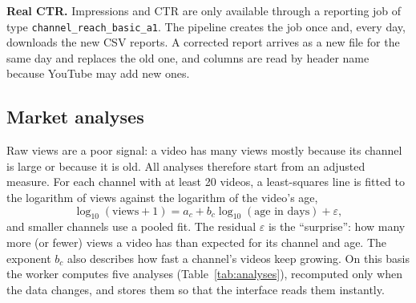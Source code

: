 \textbf{Real CTR.} Impressions and CTR are only available through a reporting job of type \texttt{channel\_reach\_basic\_a1}. The pipeline creates the job once and, every day, downloads the new CSV reports. A corrected report arrives as a new file for the same day and replaces the old one, and columns are read by header name because YouTube may add new ones.

\subsection*{Market analyses}

Raw views are a poor signal: a video has many views mostly because its channel is large or because it is old. All analyses therefore start from an adjusted measure. For each channel with at least 20 videos, a least-squares line is fitted to the logarithm of views against the logarithm of the video's age,
\begin{equation}
\log_{10}(\text{views}+1) = a_c + b_c \log_{10}(\text{age in days}) + \varepsilon ,
\label{eq:residual}
\end{equation}
and smaller channels use a pooled fit. The residual $\varepsilon$ is the ``surprise'': how many more (or fewer) views a video has than expected for its channel and age. The exponent $b_c$ also describes how fast a channel's videos keep growing. On this basis the worker computes five analyses (Table~\ref{tab:analyses}), recomputed only when the data changes, and stores them so that the interface reads them instantly.

